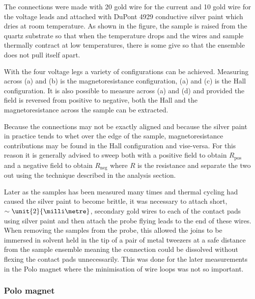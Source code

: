 The connections were made with \unit{20}{\micro\metre} gold wire for the current and \unit{10}{\micro\metre} gold wire for the voltage leads and attached with DuPont 4929 conductive silver paint which dries at room temperature. As shown in the figure, the sample is raised from the quartz substrate so that when the temperature drops and the wires and sample thermally contract at low temperatures, there is some give so that the ensemble does not pull itself apart.

With the four voltage legs a variety of configurations can be achieved. Measuring across (a) and (b) is the magnetoresistance configuration, (a) and (c) is the Hall configuration. It is also possible to measure across (a) and (d) and provided the field is reversed from positive to negative, both the Hall and the magnetoresistance across the sample can be extracted.

Because the connections may not be exactly aligned and because the silver paint in practice tends to whet over the edge of the sample, magnetoresistance contributions may be found in the Hall configuration and vise-versa. For this reason it is generally advised to sweep both with a positive field to obtain $R_{\textrm{pos}}$ and a negative field to obtain $R_{\textrm{neg}}$ where $R$ is the resistance and separate the two out using the technique described in the analysis section.

Later as the samples has been measured many times and thermal cycling had caused the silver paint to become brittle, it was necessary to attach short, $\sim\unit{2}{\milli\metre}$, secondary gold wires to each of the contact pads using silver paint and then attach the probe flying leads to the end of these wires. When removing the samples from the probe, this allowed the joins to be immersed in solvent held in the tip of a pair of metal tweezers at a safe distance from the sample ensemble meaning the connection could be dissolved without flexing the contact pads unnecessarily. This was done for the later measurements in the Polo magnet where the minimisation of wire loops was not so important.

\subsubsection{Polo magnet}

